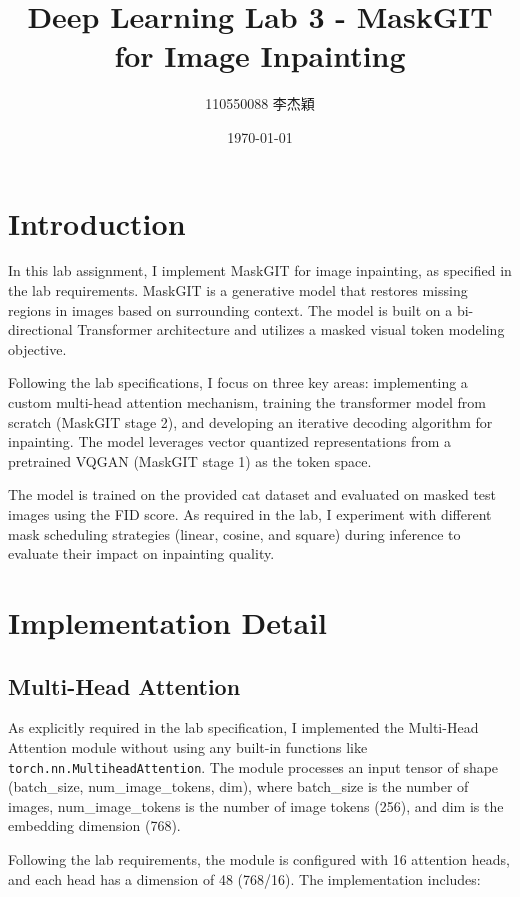 \documentclass[twocolumn,a4paper]{article}
\title{Deep Learning Lab 3 - MaskGIT for Image Inpainting}
\author{110550088 李杰穎}
\date{\today}
\begin{document}
\maketitle

\section{Introduction}

In this lab assignment, I implement MaskGIT \cite{chang2022maskgit} for image inpainting, as specified in the lab requirements. MaskGIT is a generative model that restores missing regions in images based on surrounding context. The model is built on a bi-directional Transformer \cite{vaswani2017attention} architecture and utilizes a masked visual token modeling objective.

Following the lab specifications, I focus on three key areas: implementing a custom multi-head attention mechanism, training the transformer model from scratch (MaskGIT stage 2), and developing an iterative decoding algorithm for inpainting. The model leverages vector quantized representations from a pretrained VQGAN (MaskGIT stage 1) as the token space.

The model is trained on the provided cat dataset and evaluated on masked test images using the FID score. As required in the lab, I experiment with different mask scheduling strategies (linear, cosine, and square) during inference to evaluate their impact on inpainting quality.

\section{Implementation Detail}
\subsection{Multi-Head Attention}

As explicitly required in the lab specification, I implemented the Multi-Head Attention module without using any built-in functions like \texttt{torch.nn.MultiheadAttention}. The module processes an input tensor of shape (batch\_size, num\_image\_tokens, dim), where batch\_size is the number of images, num\_image\_tokens is the number of image tokens (256), and dim is the embedding dimension (768).

Following the lab requirements, the module is configured with 16 attention heads, and each head has a dimension of 48 (768/16). The implementation includes:
\end{document}
